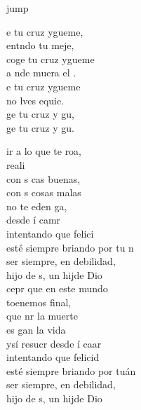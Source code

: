 \begin{cancion}jump\\
	\begin{chorus}%
		e tu cruz ygueme, \\
		entndo tu meje, \\
		coge tu cruz ygueme \\
		a nde muera el . \\
		e tu cruz ygueme \\
		no lves equie. \\
		ge tu cruz y gu, \\
		ge tu cruz y gu. \jump\\
	\end{chorus}%
	\jump
	ir a lo que te roa, \\
	 reali \\
	con s cas buenas, \\
	con s cosas malas \\
	no te eden ga, \\
	desde í camr \\
	intentando que  felici \\
	esté siempre briando por tu n \\
	 ser siempre, en debilidad, \\
	 hijo de s, un hijde Dio \\
	\jump
	cepr que en este mundo \\
	toenemos final, \\
	que nr la muerte \\
	es gan la vida  \\
	ysí resucr desde í caar\\
	intentando que  felicid \\
	esté siempre briando por tuán\\
	 ser siempre, en debilidad, \\
	 hijo de s, un hijde Dio \\
\end{cancion}%
